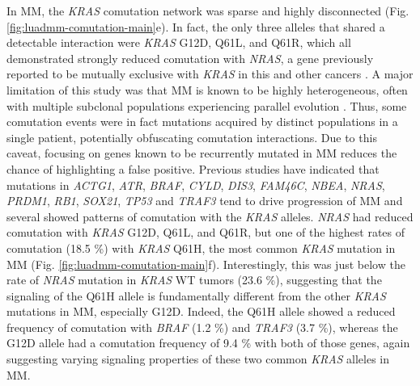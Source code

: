 \documentclass[english, 10pt, letterpaper]{article}
\newcommand{\KRAS}{\emph{KRAS}}
\begin{document}
In MM, the \KRAS{} comutation network was sparse and highly disconnected (Fig. \ref{fig:luadmm-comutation-main}e).
In fact, the only three alleles that shared a detectable interaction were \KRAS{} G12D, Q61L, and Q61R, which all demonstrated strongly reduced comutation with \emph{NRAS}, a gene previously reported to be mutually exclusive with \KRAS{} in this and other cancers \cite{Lohr2014WidespreadTherapy.}.
A major limitation of this study was that MM is known to be highly heterogeneous, often with multiple subclonal populations experiencing parallel evolution \cite{Lohr2014WidespreadTherapy., Melchor2014Single-cellMyeloma., Lionetti2015MolecularActivation., Keats2012ClonalMyeloma., Corre2015GeneticsLevel, Lohr2016GeneticResolution., Xu2017MolecularActivation.}.
Thus, some comutation events were in fact mutations acquired by distinct populations in a single patient, potentially obfuscating comutation interactions.
Due to this caveat, focusing on genes known to be recurrently mutated in MM reduces the chance of highlighting a false positive. 
Previous studies have indicated that mutations in \emph{ACTG1}, \emph{ATR}, \emph{BRAF}, \emph{CYLD}, \emph{DIS3}, \emph{FAM46C}, \emph{NBEA}, \emph{NRAS}, \emph{PRDM1}, \emph{RB1}, \emph{SOX21}, \emph{TP53} and \emph{TRAF3} tend to drive progression of MM \cite{Sondka2018, Lohr2014WidespreadTherapy.} and several showed patterns of comutation with the \KRAS{} alleles.
\emph{NRAS} had reduced comutation with \KRAS{} G12D, Q61L, and Q61R, but one of the highest rates of comutation (18.5 \%) with \KRAS{} Q61H, the most common \KRAS{} mutation in MM (Fig. \ref{fig:luadmm-comutation-main}f).
Interestingly, this was just below the rate of \emph{NRAS} mutation in \KRAS{} WT tumors (23.6 \%), suggesting that the signaling of the Q61H allele is fundamentally different from the other \KRAS{} mutations in MM, especially G12D.
Indeed, the Q61H allele showed a reduced frequency of comutation with \emph{BRAF} (1.2 \%) and \emph{TRAF3} (3.7 \%), whereas the G12D allele had a comutation frequency of 9.4 \% with both of those genes, again suggesting varying signaling properties of these two common \KRAS{} alleles in MM.
\end{document}
